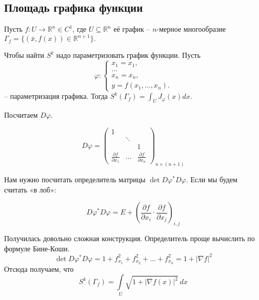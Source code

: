 \documentclass[a5paper]{article}
\theoremstyle{plain}
\theoremstyle{definition}
\numberwithin{through}{section}
\numberwithin{equation}{section}
\begin{document}
\subsection{Площадь графика функции}


Пусть $f: U \to \mathbb{R}^n \in C^1$, где $U \subseteq \mathbb{R}^n$ её график -- $n$-мерное многообразие 
$\Gamma_f = \{ (\bar{x}, f(x)) \in \mathbb{R}^{n + 1} \}.$

Чтобы найти $S^k$ надо параметризовать график функции. 
Пусть 
\begin{equation*}
\varphi:
	\begin{cases}
	x_1 = x_1, \\
	\ldots \\
	x_n = x_n, \\
	y = f(x_1, \ldots, x_n).
	\end{cases}
\end{equation*}
-- параметризация графика.
Тогда $S^k(\Gamma_f) = \int_U J_{\varphi}(x) dx.$

Посчитаем $D\varphi$. 

\[
	D\varphi = 
\begin{pmatrix}
	1 & & \\
	& \ddots & \\
	& & 1 \\\hline
	\frac{\partial f}{\partial x_1} &
	\ldots & 
	\frac{\partial f}{\partial x_n}
	
\end{pmatrix}_{n \times (n+1)}
\]

Нам нужно посчитать определитель матрицы $\det D\varphi^*
D\varphi$. Если мы будем считать «в лоб»:

\begin{equation*}
	D\varphi^* D\varphi = E +
	\left( \frac{\partial f}{\partial x_i} \cdot
	\frac{\partial f}{\partial x_j} \right)_{i, j}
\end{equation*}

Получилась довольно сложная конструкция.
Определитель проще вычислить по формуле Бине-Коши. 
\[\det D\varphi^*D\varphi = 1 + f_{x_1}^2 + f_{x_2}^2 + \ldots
+ f_{x_n}^2 = 1 + |\nabla f|^2\]
Отсюда получаем, что 
\begin{equation*} 
	S^k(\Gamma_f) = \int\limits_U \sqrt{1 + |\nabla f(x) |^2}\ dx 
\end{equation*}
\end{document}
